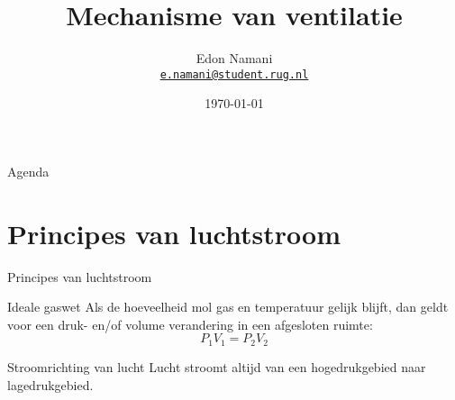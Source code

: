 \documentclass[]{beamer}
\title[Respiratie]{Mechanisme van ventilatie}
\date{\today}
\author[Edon Namani, et. al]
{%
	Edon Namani\\
	\href{mailto:e.namani@student.rug.nl}{{\tt e.namani@student.rug.nl}}
}
\institute[%
	Faculteit Gezondheidswetenschappen\\
	Rijksuniversiteit Groningen\\
	Nederland
]
{%
	Faculteit Gezondheidswetenschappen\\
	Rijksuniversiteit Groningen\\
	Nederland

}
\begin{document}
{\aauwavesbg%
	\begin{frame}
	\titlepage
\end{frame}}

\begin{frame}{Agenda}{}
	\tableofcontents
\end{frame}
\section{Principes van luchtstroom}
\begin{frame}{Principes van luchtstroom}
    \begin{block}{Ideale gaswet}
        Als de hoeveelheid mol gas en temperatuur gelijk blijft, dan geldt voor een druk- en/of volume verandering in een afgesloten ruimte:
            \begin{equation*}
                P_1V_1 = P_2V_2
            \end{equation*}
    \end{block}
    \begin{block}{Stroomrichting van lucht}
        Lucht stroomt altijd van een hogedrukgebied naar lagedrukgebied.
    \end{block}
\end{frame}
\end{document}
